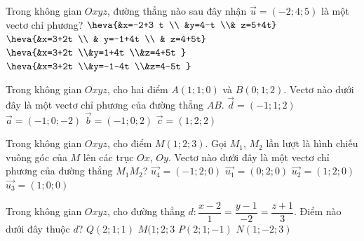 \begin{ex}%
	Trong không gian $Oxyz$, đường thẳng nào sau đây nhận $\overrightarrow{u}=(-2;4;5)$ là một vectơ chỉ phương?
	\choice
	{$\heva{&x=-2+3 t \\ &y=4-t \\& z=5+4t}$}
	{$\heva{&x=3+2t \\ & y=-1+4t \\ & z=4+5t}$}
	{$\heva{&x=3+2t  \\&y=1+4t  \\&z=4+5t }$}
	{\True $\heva{&x=3+2t  \\&y=-1-4t  \\&z=4-5t }$}
\end{ex}
\begin{ex}%
	Trong không gian $Oxyz$, cho hai điểm $A(1;1;0)$ và $B( 0;1;2 )$. Vectơ nào dưới đây là một vectơ chỉ phương của đường thẳng $AB$.
	\choice
	{ $\overrightarrow{d}=(-1;1;2)$}
	{ $\overrightarrow{a}=(-1;0;-2)$}
	{\True $\overrightarrow{b}=(-1;0;2)$}
	{ $\overrightarrow{c}=( 1;2;2)$}
\end{ex}
\begin{ex}%
	Trong không gian $Oxyz$, cho điểm $M( 1;2;3 )$. Gọi ${M}_{1}$, ${M}_{2}$ lần lượt là hình chiếu vuông góc của $M$ lên các trục $Ox$, $Oy$. Vectơ nào dưới đây là một vectơ chỉ phương của đường thẳng $M_1M_2$?
	\choice
	{ \True $\overrightarrow{{{u}_{4}}}=( -1;2;0 )$}
	{ $\overrightarrow{{u}_{1}}=( 0;2;0)$}
	{  $\overrightarrow {u_2}=( 1;2;0 )$}
	{ $\overrightarrow{{{u}_{3}}}=( 1;0;0 )$}
\end{ex}
\begin{ex}%
	Trong không gian $Oxyz$, cho đường thẳng $d \colon\dfrac{x-2}{1}=\dfrac{y-1}{-2}=\dfrac{z+1}{3}$. Điểm nào dưới đây thuộc $d$?
	\choice
	{ $Q( 2;1;1 )$}
	{ $M( 1;2;3 $}
	{ \True $P( 2;1;-1)$}
	{ $N( 1;-2;3) $}
\end{ex}
